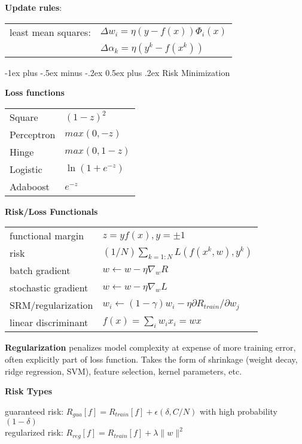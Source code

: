 \documentclass[10pt,landscape]{article}
\makeatletter
\renewcommand{\section}{\@startsection{section}{1}{0mm}%
                                {-1ex plus -.5ex minus -.2ex}%
                                {0.5ex plus .2ex}%
                                {\normalfont\large\bfseries}}
\makeatother
\begin{document}
\begin{multicols}{3}
\textbf{Update rules}:

\begin{tabular}{@{}ll@{}}
least mean squares:         & $\Delta w_i = \eta (y - f(x)) \Phi_i (x)$ \\
                            & $\Delta \alpha_k = \eta (y^k - f(x^k))$
\end{tabular}


\section{Risk Minimization}

\textbf{Loss functions}

\begin{tabular}{@{}ll@{}}
Square          & $(1-z)^2$ \\
Perceptron      & $max(0, -z)$ \\
Hinge           & $max(0, 1-z)$ \\
Logistic        & $\ln(1+e^{-z})$ \\
Adaboost        & $e^{-z}$
\end{tabular}


\textbf{Risk/Loss Functionals}

\begin{tabular}{@{}ll@{}}
functional margin       & $z = y f(x), y=\pm 1$ \\
risk                    & $(1/N)\sum_{k=1:N} L(f(x^k, w), y^k)$ \\
batch gradient          & $w \leftarrow w - \eta\nabla_w R$ \\
stochastic gradient     & $w \leftarrow w - \eta\nabla_w L$ \\
SRM/regularization      & $w_i \leftarrow (1 - \gamma) w_i - \eta \partial R_{train} / \partial w_j$ \\
linear discriminant     & $f(x) = \sum_i w_i x_i = wx$ \\
\end{tabular}

\textbf{Regularization} penalizes model complexity at expense of more training error, often explicitly part of loss function. Takes the form of shrinkage (weight decay, ridge regression, SVM), feature selection, kernel parameters, etc.

\textbf{Risk Types}

guaranteed risk: $R_{gua}[f] = R_{train}[f] + \epsilon (\delta, C/N)$ with high probability $(1-\delta)$ \\
regularized risk: $R_{reg}[f] = R_{train}[f] + \lambda \lVert w \rVert^2$


\end{multicols}
\end{document}
